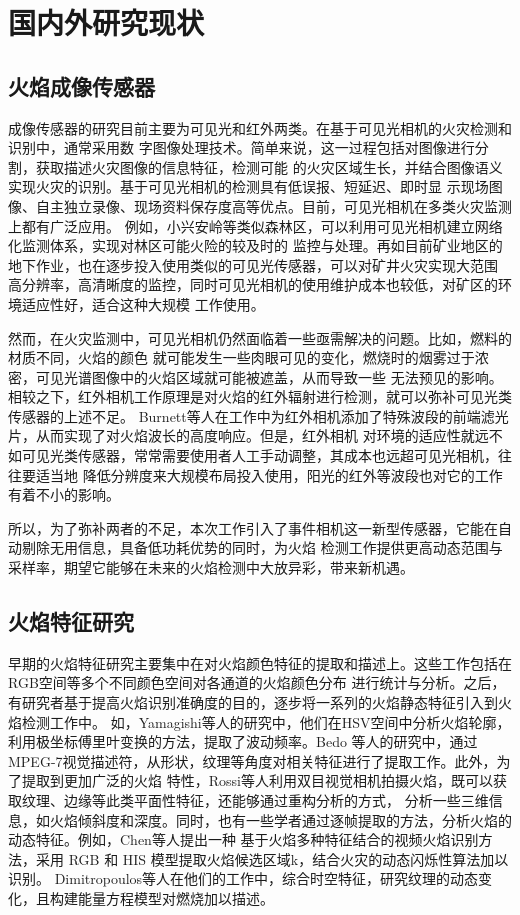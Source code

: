\section{国内外研究现状}

\subsection{火焰成像传感器}

成像传感器的研究目前主要为可见光和红外两类。在基于可见光相机的火灾检测和识别中，通常采用数
字图像处理技术。简单来说，这一过程包括对图像进行分割，获取描述火灾图像的信息特征，检测可能
的火灾区域生长，并结合图像语义实现火灾的识别。基于可见光相机的检测具有低误报、短延迟、即时显
示现场图像、自主独立录像、现场资料保存度高等优点。目前，可见光相机在多类火灾监测上都有广泛应用。
例如，小兴安岭等类似森林区，可以利用可见光相机建立网络化监测体系，实现对林区可能火险的较及时的
监控与处理。再如目前矿业地区的地下作业，也在逐步投入使用类似的可见光传感器，可以对矿井火灾实现大范围
高分辨率，高清晰度的监控，同时可见光相机的使用维护成本也较低，对矿区的环境适应性好，适合这种大规模
工作使用。

然而，在火灾监测中，可见光相机仍然面临着一些亟需解决的问题。比如，燃料的材质不同，火焰的颜色
就可能发生一些肉眼可见的变化，燃烧时的烟雾过于浓密，可见光谱图像中的火焰区域就可能被遮盖，从而导致一些
无法预见的影响。相较之下，红外相机工作原理是对火焰的红外辐射进行检测，就可以弥补可见光类传感器的上述不足。
Burnett等人在工作中为红外相机添加了特殊波段的前端滤光片，从而实现了对火焰波长的高度响应。但是，红外相机
对环境的适应性就远不如可见光类传感器，常常需要使用者人工手动调整，其成本也远超可见光相机，往往要适当地
降低分辨度来大规模布局投入使用，阳光的红外等波段也对它的工作有着不小的影响。

所以，为了弥补两者的不足，本次工作引入了事件相机这一新型传感器，它能在自动剔除无用信息，具备低功耗优势的同时，为火焰
检测工作提供更高动态范围与采样率，期望它能够在未来的火焰检测中大放异彩，带来新机遇。

\subsection{火焰特征研究}

早期的火焰特征研究主要集中在对火焰颜色特征的提取和描述上。这些工作包括在RGB空间等多个不同颜色空间对各通道的火焰颜色分布
进行统计与分析。之后，有研究者基于提高火焰识别准确度的目的，逐步将一系列的火焰静态特征引入到火焰检测工作中。
如，Yamagishi等人的研究中，他们在HSV空间中分析火焰轮廓，利用极坐标傅里叶变换的方法，提取了波动频率。Bedo
等人的研究中，通过MPEG-7视觉描述符，从形状，纹理等角度对相关特征进行了提取工作。此外，为了提取到更加广泛的火焰
特性，Rossi等人利用双目视觉相机拍摄火焰，既可以获取纹理、边缘等此类平面性特征，还能够通过重构分析的方式，
分析一些三维信息，如火焰倾斜度和深度。同时，也有一些学者通过逐帧提取的方法，分析火焰的动态特征。例如，Chen等人提出一种
基于火焰多种特征结合的视频火焰识别方法，采用 RGB 和 HIS 模型提取火焰候选区域k，结合火灾的动态闪烁性算法加以识别。
Dimitropoulos等人在他们的工作中，综合时空特征，研究纹理的动态变化，且构建能量方程模型对燃烧加以描述。


